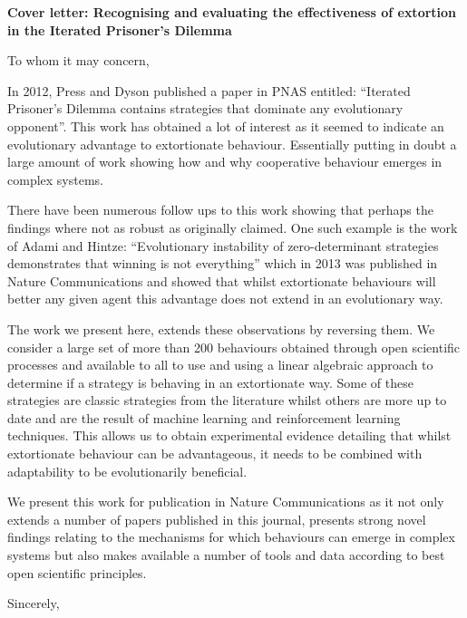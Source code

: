\documentclass[11pt]{letter}
\begin{document}
\signature{The authors}

\begin{letter}{}

\textbf{Cover letter: Recognising and evaluating the effectiveness
       of extortion in the Iterated Prisoner's Dilemma}

To whom it may concern,

In 2012, Press and Dyson published a paper in PNAS entitled: ``Iterated
Prisoner’s Dilemma contains strategies that dominate any evolutionary
opponent''. This work has obtained a lot of interest as it seemed to indicate an
evolutionary advantage to extortionate behaviour. Essentially putting in doubt a
large amount of work showing how and why cooperative behaviour emerges in
complex systems.

There have been numerous follow ups to this work showing that perhaps the
findings where not as robust as originally claimed. One such example is the work
of Adami and Hintze: ``Evolutionary instability of zero-determinant strategies
demonstrates that winning is not everything'' which in 2013 was published in
Nature Communications and showed that whilst extortionate behaviours will better
any given agent this advantage does not extend in an evolutionary way.

The work we present here, extends these observations by reversing them. We
consider a large set of more than 200 behaviours obtained through open
scientific processes and available to all to use and using a linear algebraic
approach to determine if a strategy is behaving in an extortionate way. Some of
these strategies are classic strategies from the literature whilst others are
more up to date and are the result of machine learning and reinforcement
learning techniques. This allows us to obtain experimental evidence detailing
that whilst extortionate behaviour can be advantageous, it needs to be combined
with adaptability to be evolutionarily beneficial.

We present this work for publication in Nature Communications as it not only
extends a number of papers published in this journal, presents strong novel
findings relating to the mechanisms for which behaviours can emerge in complex
systems but also makes available a number of tools and data according to best
open scientific principles.

\closing{Sincerely,}

\end{letter}
\end{document}
